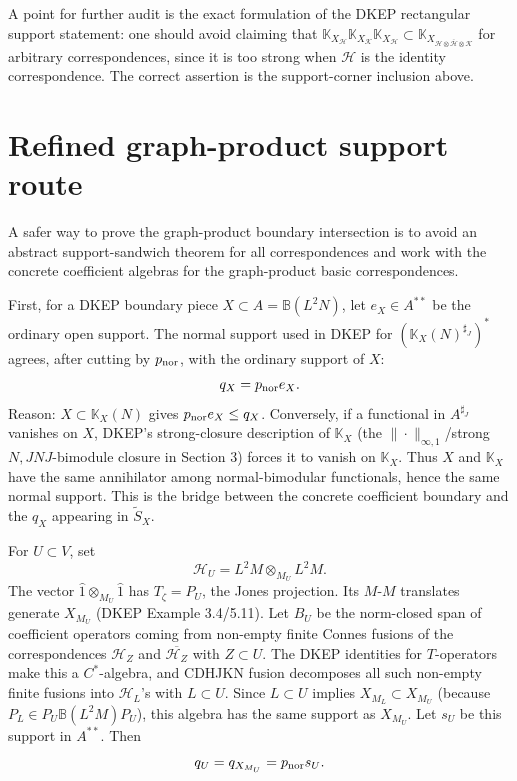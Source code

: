 \documentclass{article}
\newcommand{\K}{\mathbb K}
\begin{document}
A point for further audit is the exact formulation of the DKEP rectangular
support statement: one should avoid claiming that \(\K_{X_{\mathcal H}}
\K_{X_{\mathcal K}}\K_{X_{\mathcal H}}\subset
\K_{X_{\mathcal H\otimes\bar{\mathcal H}\otimes\mathcal K}}\) for arbitrary
correspondences, since it is too strong when \(\mathcal H\) is the identity
correspondence.  The correct assertion is the support-corner inclusion above.



\section*{Refined graph-product support route}

A safer way to prove the graph-product boundary intersection is to avoid an
abstract support-sandwich theorem for all correspondences and work with the
concrete coefficient algebras for the graph-product basic correspondences.

First, for a DKEP boundary piece \(X\subset A=\mathbb B(L^2N)\), let
\(e_X\in A^{**}\) be the ordinary open support.  The normal support used in
DKEP for \((\mathbb K_X(N)^{\sharp_J})^*\) agrees, after cutting by
\(p_{\rm nor}\), with the ordinary support of \(X\):
\[
        q_X=p_{\rm nor}e_X .
\]
Reason: \(X\subset \mathbb K_X(N)\) gives \(p_{\rm nor}e_X\le q_X\).  Conversely,
if a functional in \(A^{\sharp_J}\) vanishes on \(X\), DKEP's strong-closure
description of \(\mathbb K_X\) (the \(\|\cdot\|_{\infty,1}\)/strong
\(N,JNJ\)-bimodule closure in Section 3) forces it to vanish on
\(\mathbb K_X\).  Thus \(X\) and \(\mathbb K_X\) have the same annihilator among
normal-bimodular functionals, hence the same normal support.  This is the bridge
between the concrete coefficient boundary and the \(q_X\) appearing in
\(\widetilde S_X\).

For \(U\subset V\), set
\[
        \mathcal H_U=L^2M\otimes_{M_U}L^2M .
\]
The vector \(\hat1\otimes_{M_U}\hat1\) has \(T_\zeta=P_U\), the Jones projection.
Its \(M\)-\(M\) translates generate \(X_{M_U}\) (DKEP Example 3.4/5.11).  Let
\(B_U\) be the norm-closed span of coefficient operators coming from non-empty finite
Connes fusions of the correspondences \(\mathcal H_Z\) and
\(\overline{\mathcal H_Z}\) with \(Z\subset U\).  The DKEP identities for
\(T\)-operators make this a \(C^*\)-algebra, and CDHJKN fusion decomposes all
such non-empty finite fusions into \(\mathcal H_L\)'s with \(L\subset U\).  Since
\(L\subset U\) implies \(X_{M_L}\subset X_{M_U}\) (because \(P_L\in P_U
\mathbb B(L^2M)P_U\)), this algebra has the same support as \(X_{M_U}\).  Let \(s_U\)
be this support in \(A^{**}\).  Then
\[
        q_U=q_{X_{M_U}}=p_{\rm nor}s_U .
\]
\end{document}
